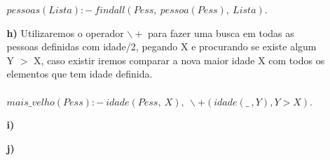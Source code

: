 \documentclass[12pt]{article}
\begin{document}
\begin{itemize}
\begin{itemize}
					$pessoas(Lista) :- \ findall(Pess, \ pessoa(Pess), \ Lista).$\\
				\item[\textbf{h) }]
					\hfill\newline
					Utilizaremos o operador $\backslash +$ para fazer uma busca em todas
					as pessoas definidas com idade/2, pegando X e procurando se existe
					algum Y $>$ X, caso existir iremos comparar a nova maior idade X com todos
					os elementos que tem idade definida.\\ \\
					$mais\_velho(Pess) :- \ idade(Pess, \ X), \ \backslash + (idade(\_ \ , Y), Y > X).$\\
				\item[\textbf{i) }]
				\item[\textbf{j) }]
			\end{itemize}
	\end{itemize}
\end{document}
